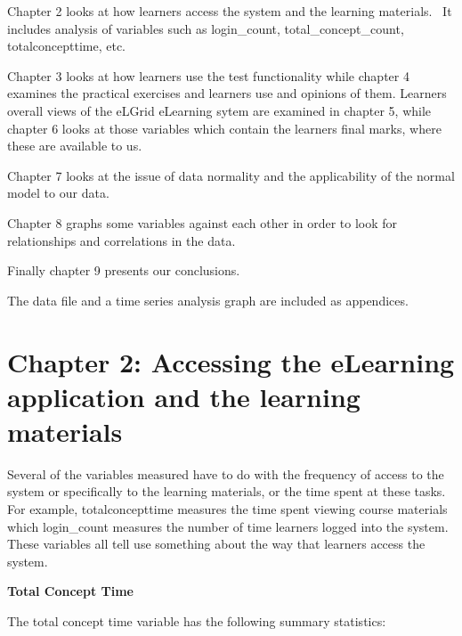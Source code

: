 \documentclass[12pt,twoside]{article}
\begin{document}
Chapter 2 looks at how learners access the system and the learning
materials.~ It includes analysis of variables such as login\_count,
total\_concept\_count, totalconcepttime, etc.

Chapter 3 looks at how learners use the test functionality while chapter
4 examines the practical exercises and learners{\textquotesingle} use
and opinions of them.\newline
Learners overall views of the eLGrid eLearning sytem are examined in
chapter 5, while chapter 6 looks at those variables which contain the
learners final marks, where these are available to us.

Chapter 7 looks at the issue of data normality and the applicability of
the normal model to our data. 

Chapter 8 graphs some variables against each other in order to look for
relationships and correlations in the data. 

Finally chapter 9 presents our conclusions. 

The data file and a time series analysis graph are included as
appendices. 

\section[Chapter 2: Accessing the eLearning application and the learning
materials ]{Chapter 2: Accessing the eLearning application and the
learning materials }
\newline
Several of the variables measured have to do with the frequency of
access to the system or specifically to the learning materials, or the
time spent at these tasks.~ For example, totalconcepttime measures the
time spent viewing course materials which login\_count measures the
number of time learners logged into the system.~ These variables all
tell use something about the way that learners access the system.

{\bfseries
Total Concept Time}

The total concept time variable has the following summary statistics:

~ 
\end{document}
